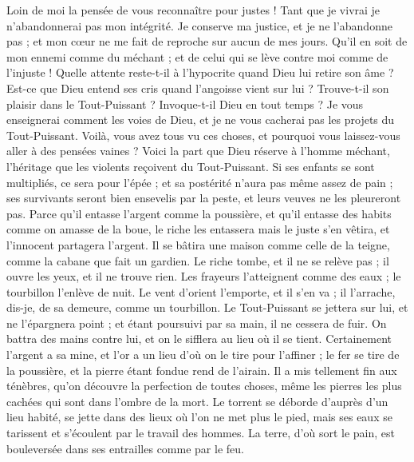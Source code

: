 \begin{multicols}{2}
Loin de moi la pensée de vous reconnaître pour justes ! Tant que je vivrai je n'abandonnerai pas mon intégrité.
Je conserve ma justice, et je ne l'abandonne pas ; et mon cœur ne me fait de reproche sur aucun de mes jours.
Qu'il en soit de mon ennemi comme du méchant ; et de celui qui se lève contre moi comme de l'injuste !
Quelle attente reste-t-il à l'hypocrite quand Dieu lui retire son âme ?
Est-ce que Dieu entend ses cris quand l'angoisse vient sur lui ?
Trouve-t-il son plaisir dans le Tout-Puissant ? Invoque-t-il Dieu en tout temps ?
Je vous enseignerai comment les voies de Dieu, et je ne vous cacherai pas les projets du Tout-Puissant.
Voilà, vous avez tous vu ces choses, et pourquoi vous laissez-vous aller à des pensées vaines ?
Voici la part que Dieu réserve à l'homme méchant, l'héritage que les violents reçoivent du Tout-Puissant.
Si ses enfants se sont multipliés, ce sera pour l'épée ; et sa postérité n'aura pas même assez de pain ;
ses survivants seront bien ensevelis par la peste, et leurs veuves ne les pleureront pas.
Parce qu'il entasse l'argent comme la poussière, et qu'il entasse des habits comme on amasse de la boue,
le riche les entassera mais le juste s'en vêtira, et l'innocent partagera l'argent.
Il se bâtira une maison comme celle de la teigne, comme la cabane que fait un gardien.
Le riche tombe, et il ne se relève pas ; il ouvre les yeux, et il ne trouve rien.
Les frayeurs l'atteignent comme des eaux ; le tourbillon l'enlève de nuit.
Le vent d'orient l'emporte, et il s'en va ; il l'arrache, dis-je, de sa demeure, comme un tourbillon.
 Le Tout-Puissant se jettera sur lui, et ne l'épargnera point ; et étant poursuivi par sa main, il ne cessera de fuir.
On battra des mains contre lui, et on le sifflera au lieu où il se tient.
\VerseOne{}Certainement l'argent a sa mine, et l'or a un lieu d'où on le tire pour l'affiner ;
le fer se tire de la poussière, et la pierre étant fondue rend de l'airain.
Il a mis tellement fin aux ténèbres, qu'on découvre la perfection de toutes choses, même les pierres les plus cachées qui sont dans l'ombre de la mort.
Le torrent se déborde d'auprès d'un lieu habité, se jette dans des lieux où l'on ne met plus le pied, mais ses eaux se tarissent et s'écoulent par le travail des hommes.
La terre, d'où sort le pain, est bouleversée dans ses entrailles comme par le feu.

\end{multicols}
